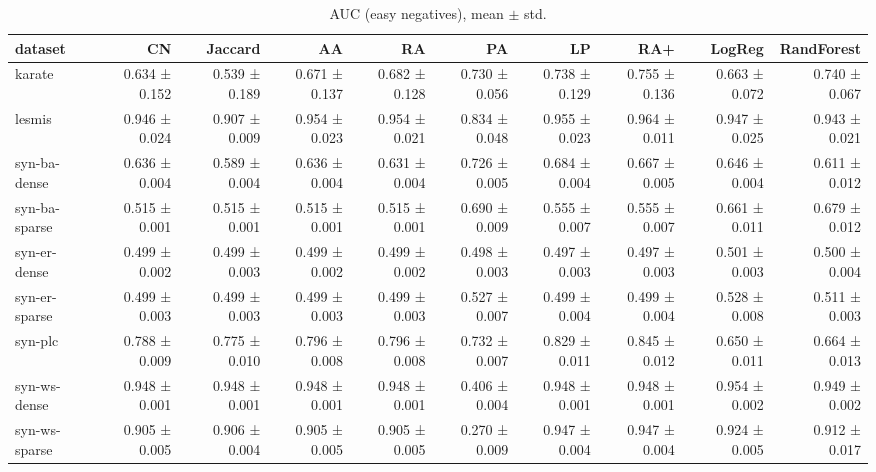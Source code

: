 \begin{table}[t]
\centering
\caption{AUC (easy negatives), mean $\pm$ std.}
\label{tab:main_auc_easy}
\begin{tabular}{lrrrrrrrrr}
\hline
dataset & CN & Jaccard & AA & RA & PA & LP & RA+ & LogReg & RandForest \\
\hline
karate & 0.634 ± 0.152 & 0.539 ± 0.189 & 0.671 ± 0.137 & 0.682 ± 0.128 & 0.730 ± 0.056 & 0.738 ± 0.129 & 0.755 ± 0.136 & 0.663 ± 0.072 & 0.740 ± 0.067 \\
lesmis & 0.946 ± 0.024 & 0.907 ± 0.009 & 0.954 ± 0.023 & 0.954 ± 0.021 & 0.834 ± 0.048 & 0.955 ± 0.023 & 0.964 ± 0.011 & 0.947 ± 0.025 & 0.943 ± 0.021 \\
syn-ba-dense & 0.636 ± 0.004 & 0.589 ± 0.004 & 0.636 ± 0.004 & 0.631 ± 0.004 & 0.726 ± 0.005 & 0.684 ± 0.004 & 0.667 ± 0.005 & 0.646 ± 0.004 & 0.611 ± 0.012 \\
syn-ba-sparse & 0.515 ± 0.001 & 0.515 ± 0.001 & 0.515 ± 0.001 & 0.515 ± 0.001 & 0.690 ± 0.009 & 0.555 ± 0.007 & 0.555 ± 0.007 & 0.661 ± 0.011 & 0.679 ± 0.012 \\
syn-er-dense & 0.499 ± 0.002 & 0.499 ± 0.003 & 0.499 ± 0.002 & 0.499 ± 0.002 & 0.498 ± 0.003 & 0.497 ± 0.003 & 0.497 ± 0.003 & 0.501 ± 0.003 & 0.500 ± 0.004 \\
syn-er-sparse & 0.499 ± 0.003 & 0.499 ± 0.003 & 0.499 ± 0.003 & 0.499 ± 0.003 & 0.527 ± 0.007 & 0.499 ± 0.004 & 0.499 ± 0.004 & 0.528 ± 0.008 & 0.511 ± 0.003 \\
syn-plc & 0.788 ± 0.009 & 0.775 ± 0.010 & 0.796 ± 0.008 & 0.796 ± 0.008 & 0.732 ± 0.007 & 0.829 ± 0.011 & 0.845 ± 0.012 & 0.650 ± 0.011 & 0.664 ± 0.013 \\
syn-ws-dense & 0.948 ± 0.001 & 0.948 ± 0.001 & 0.948 ± 0.001 & 0.948 ± 0.001 & 0.406 ± 0.004 & 0.948 ± 0.001 & 0.948 ± 0.001 & 0.954 ± 0.002 & 0.949 ± 0.002 \\
syn-ws-sparse & 0.905 ± 0.005 & 0.906 ± 0.004 & 0.905 ± 0.005 & 0.905 ± 0.005 & 0.270 ± 0.009 & 0.947 ± 0.004 & 0.947 ± 0.004 & 0.924 ± 0.005 & 0.912 ± 0.017 \\
\hline
\end{tabular}
\end{table}
